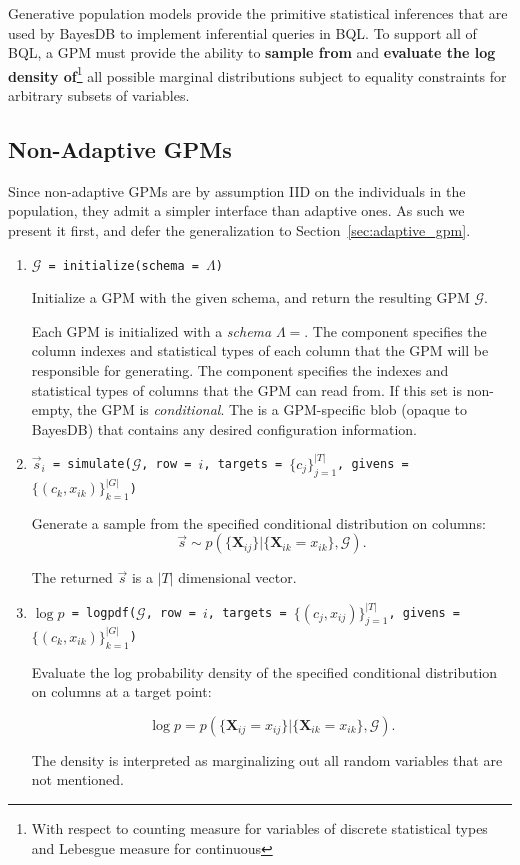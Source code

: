 \documentclass[10pt,letterpaper]{article}
\newcommand{\set}[1]{\{#1\}}
\newcommand{\G}{\mathcal{G}}
\begin{document}
Generative population models provide the primitive statistical inferences that
are used by BayesDB to implement inferential queries in BQL. To support all of
BQL, a GPM must provide the ability to \textbf{sample from} and \textbf{evaluate
the log density of}\footnote{With respect to counting measure for variables of
discrete statistical types and Lebesgue measure for continuous}
all possible marginal distributions subject to equality
constraints for arbitrary subsets of variables.

\subsection{Non-Adaptive GPMs}

Since non-adaptive GPMs are by assumption IID on the individuals in
the population, they admit a simpler interface than adaptive ones.  As
such we present it first, and defer the generalization to
Section~\ref{sec:adaptive_gpm}.

\begin{enumerate}

\item \texttt{$\G$ = initialize(schema = $\Lambda$)}

    Initialize a GPM with the given schema, and return the resulting GPM
    $\G$.

    Each GPM is initialized with a \textit{schema} $\Lambda=$. The  component specifies
    the column indexes and statistical types of each column that the GPM will be
    responsible for generating. The  component specifies the
    indexes and statistical types of columns that the GPM can read
    from.  If this set is non-empty, the GPM is \emph{conditional}.
    The  is a GPM-specific blob (opaque to BayesDB) that contains any
    desired configuration information.

\item \texttt{$\vec{s}_i$ =
    simulate($\G$, row = $i$, targets = $\set{c_j}_{j=1}^{|T|}$, givens
    = $\set{(c_k, x_{ik})}_{k=1}^{|G|}$)}

    Generate a sample from the specified conditional distribution on columns:
    $$
    \vec{s} \sim p( \set{ \mathbf{X}_{ij} } |
    \set{ \mathbf{X}_{ik} = x_{ik} }, \G).
    $$

    The returned $\vec{s}$ is a $|T|$ dimensional vector.

\item \texttt{$\log p$ =
    logpdf($\G$, row = $i$, targets = $\set{(c_j, x_{ij})}_{j=1}^{|T|}$,
    givens = $\set{(c_k, x_{ik})}_{k=1}^{|G|}$)}

    Evaluate the log probability density of the specified conditional
    distribution on columns at a target point:

    $$
    \log p = p( \set{ \mathbf{X}_{ij} = x_{ij} } |
    \set{ \mathbf{X}_{ik} = x_{ik} }, \G).
    $$

    The density is interpreted as marginalizing out all random
    variables that are not mentioned.

\end{enumerate}
\end{document}
